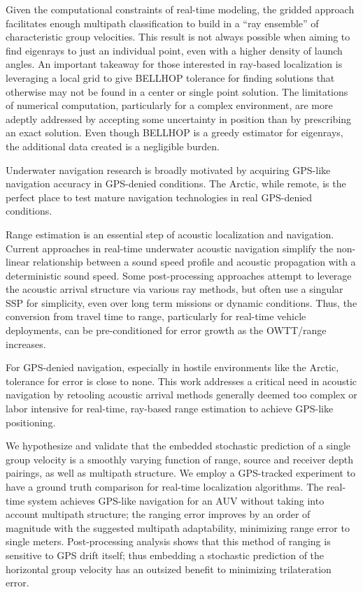 Given the computational constraints of real-time modeling, the gridded approach facilitates enough multipath classification to build in a ``ray ensemble'' of characteristic group velocities.
This result is not always possible when aiming to find eigenrays to just an individual point, even with a higher density of launch angles.
An important takeaway for those interested in ray-based localization is leveraging a local grid to give BELLHOP tolerance for finding solutions that otherwise may not be found in a center or single point solution.
The limitations of numerical computation, particularly for a complex environment, are more adeptly addressed by accepting some uncertainty in position than by prescribing an exact solution.
Even though BELLHOP is a greedy estimator for eigenrays, the additional data created is a negligible burden. 

Underwater navigation research is broadly motivated by acquiring GPS-like navigation accuracy in GPS-denied conditions.
The Arctic, while remote, is the perfect place to test mature navigation technologies in real GPS-denied conditions.

Range estimation is an essential step of acoustic localization and navigation.
Current approaches in real-time underwater acoustic navigation simplify the non-linear relationship between a sound speed profile and acoustic propagation with a deterministic sound speed.
Some post-processing approaches attempt to leverage the acoustic arrival structure via various ray methods, but often use a singular SSP for simplicity, even over long term missions or dynamic conditions.
Thus, the conversion from travel time to range, particularly for real-time vehicle deployments, can be pre-conditioned for error growth as the OWTT/range increases.

For GPS-denied navigation, especially in hostile environments like the Arctic, tolerance for error is close to none.
This work addresses a critical need in acoustic navigation by retooling acoustic arrival methods generally deemed too complex or labor intensive for real-time, ray-based range estimation to achieve GPS-like positioning.

We hypothesize and validate that the embedded stochastic prediction of a single group velocity is a smoothly varying function of range, source and receiver depth pairings, as well as multipath structure.
We employ a GPS-tracked experiment to have a ground truth comparison for real-time localization algorithms.
The real-time system achieves GPS-like navigation for an AUV without taking into account multipath structure; the ranging error improves by an order of magnitude with the suggested multipath adaptability, minimizing range error to single meters.
Post-processing analysis shows that this method of ranging is sensitive to GPS drift itself; thus embedding a stochastic prediction of the horizontal group velocity has an outsized benefit to minimizing trilateration error.

